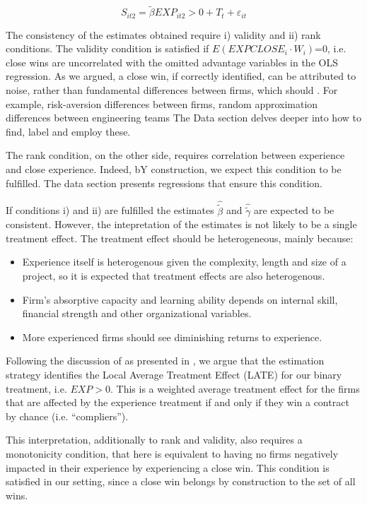 \begin{equation}
\label{eqn:secondstage}
S_{it2}= \tilde{\beta} EXP_{it2}>0+T_t+\varepsilon_{it}
\end{equation}

The consistency of the estimates obtained require i) validity and ii) rank conditions. The validity condition is satisfied if $E(EXPCLOSE_{i}\cdot W_i)$=0, i.e. close wins are uncorrelated with the omitted advantage variables in the OLS regression. As we argued, a close win, if correctly identified, can be attributed to noise, rather than fundamental differences between firms, which should . For example, risk-aversion differences between firms, random approximation differences between engineering teams The Data section delves deeper into how to find, label and employ these.

The rank condition, on the other side, requires correlation between experience and close experience. Indeed, bY construction, we expect this condition to be fulfilled.  The data section presents regressions that ensure this condition.

If conditions i) and ii) are fulfilled the estimates $\hat{\tilde{\beta}}$ and $\hat{\tilde{\gamma}}$ are expected to be consistent. However, the intepretation of the estimates is not likely to be a single treatment effect. The treatment effect should be heterogeneous, mainly because:
\vspace{-5pt}
\begin{itemize}[itemsep=1pt]
  \item Experience itself is heterogenous given the complexity, length and size of a project, so it is expected that treatment effects are also heterogenous.
  \item Firm's absorptive capacity and learning ability depends on internal skill, financial strength and other organizational variables.
  \item More experienced firms should see diminishing returns to experience.
  \end{itemize}

Following the discussion of \parencite{angrist1995identification} as presented in \parencite{hansen2009econometrics}, we argue that the estimation strategy identifies the Local Average Treatment Effect (LATE) for our binary treatment, i.e. $EXP>0$. This is a weighted average treatment effect for the firms that are affected by the experience treatment if and only if they win a contract by chance (i.e. “compliers”).

This interpretation, additionally to rank and validity, also requires a monotonicity condition, that here is equivalent to having no firms negatively impacted in their experience by experiencing a close win. This condition is satisfied in our setting, since a close win belongs by construction to the set of all wins.

